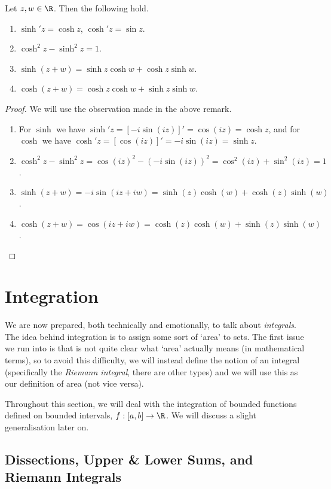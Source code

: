 \documentclass[a4paper]{scrartcl}
\begin{document}
\begin{proposition}
	Let $z, w \in \R$. Then the following hold.
	\begin{enumerate}[label=(\roman*)]
		\item $\sinh' z = \cosh z$, $\cosh' z = \sin z$.
		\item $\cosh^2 z - \sinh^2 z = 1$.
		\item $\sinh (z+w)=\sinh z \cosh w+\cosh z \sinh w$.
		\item $\cosh (z+w)=\cosh z \cosh w+\sinh z \sinh w$.
	\end{enumerate}
\end{proposition}
\begin{proof}
We will use the observation made in the above remark.
\begin{enumerate}[label=(\roman*)]
	\item For $\sinh$ we have $\sinh'z = [-i\sin(iz)]' = \cos(iz) = \cosh z$, and for $\cosh$ we have $\cosh'z = [\cos(iz)]' = -i\sin(iz) = \sinh z$.
	\item $\cosh^2 z - \sinh^2 z = \cos(iz)^2 - (-i\sin(iz))^2 = \cos^2(iz) + \sin^2(iz) = 1$.
	\item $\sinh(z + w) = -i\sin(iz + iw)= \sinh(z)\cosh(w) + \cosh(z)\sinh(w)$.
	\item $\cosh(z + w) = \cos(iz + iw)= \cosh(z)\cosh(w) + \sinh(z)\sinh(w)$.\qedhere
\end{enumerate}
\end{proof}

\clearpage
\section{Integration}

We are now prepared, both technically and emotionally, to talk about \emph{integrals}. 
The idea behind integration is to assign some sort of `area' to sets. The first issue we run into is that is not quite clear what `area' actually means (in mathematical terms), so to avoid this difficulty, we will instead define the notion of an integral (specifically the \emph{Riemann integral}, there are other types) and we will use this as our definition of area (not vice versa). 

Throughout this section, we will deal with the integration of bounded functions defined on bounded intervals, $f: [a, b] \rightarrow \R$. We will discuss a slight generalisation later on.

\subsection{Dissections, Upper \& Lower Sums, and Riemann Integrals}
\end{document}
